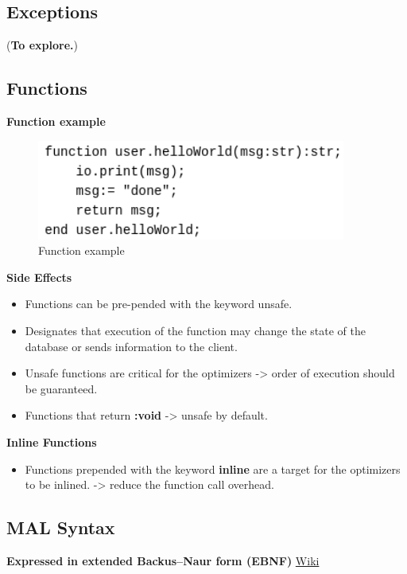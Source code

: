 \documentclass[11pt]{article}
\begin{document}
\subsection{Exceptions}
\label{sec:orgd9945ad}

(\textbf{To explore.})

\subsection{Functions}
\label{sec:orgb518795}

\textbf{Function example}
\begin{figure}[htbp]
\centering
\includegraphics[width=4.0in]{./Pictures/fun-ex.png}
\caption{\label{fig:org47266f3}
Function example}
\end{figure}

\textbf{Side Effects}
\begin{itemize}
\item Functions can be pre-pended with the keyword unsafe.
\item Designates that execution of the function may change the state of the database or sends information to the client.
\item Unsafe functions are critical for the optimizers -> order of execution should be guaranteed.
\item Functions that return \textbf{:void} -> unsafe by default.
\end{itemize}

\textbf{Inline Functions}
\begin{itemize}
\item Functions prepended with the keyword \textbf{inline} are a target for the optimizers to be inlined. -> reduce the function call overhead.
\end{itemize}

\subsection{MAL Syntax}
\label{sec:org8bc6049}

\textbf{Expressed in extended Backus–Naur form (EBNF)} \href{https://en.wikipedia.org/wiki/Extended\_Backus\%E2\%80\%93Naur\_form}{Wiki}
\end{document}
